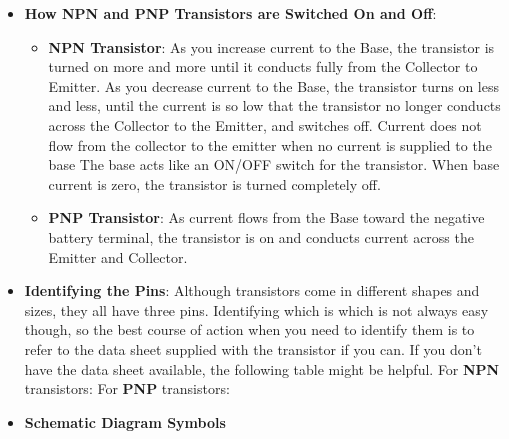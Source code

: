 \documentclass{report}
\begin{document}
\begin{itemize}
        \item \textbf{How NPN and PNP Transistors are Switched On and Off}: 
            \begin{itemize}
                \item \textbf{NPN Transistor}: As you increase current to the Base, the transistor is turned on more and more until it conducts fully from the Collector to Emitter.
                    \bigbreak \noindent 
                    As you decrease current to the Base, the transistor turns on less and less, until the current is so low that the transistor no longer conducts across the Collector to the Emitter, and switches off.
                    \bigbreak \noindent 
                    Current does not flow from the collector to the emitter when no current is supplied to the base
                    \bigbreak \noindent 
                    The base acts like an ON/OFF switch for the transistor. When base current is zero, the transistor is turned completely off.
                \item \textbf{PNP Transistor}: As current flows from the Base toward the negative battery terminal, the transistor is on and conducts current across the Emitter and Collector.
            \end{itemize}
        \item \textbf{Identifying the Pins}: Although transistors come in different shapes and sizes, they all have three pins. Identifying which is which is not always easy though, so the best course of action when you need to identify them is to refer to the data sheet supplied with the transistor if you can. If you don't have the data sheet available, the following table might be helpful.
            \bigbreak \noindent 
            For \textbf{NPN} transistors:
            \bigbreak \noindent 
            \bigbreak \noindent 
            For \textbf{PNP} transistors: 
            \bigbreak \noindent 
        \item \textbf{Schematic Diagram Symbols}
            \bigbreak \noindent 


    \end{itemize}
\end{document}
